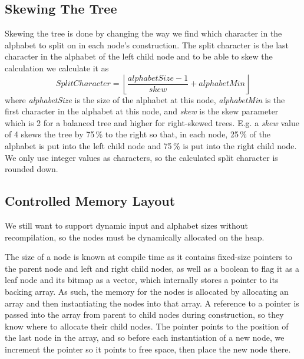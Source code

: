 \subsection{Skewing The Tree}
\label{sec:SkewingTheTree}
Skewing the tree is done by changing the way we find which character in the alphabet to split on in each node's construction.
The split character is the last character in the alphabet of the left child node and to be able to skew the calculation we calculate it as
\[\mathit{SplitCharacter} = \left\lfloor \frac{\mathit{alphabetSize}-1}{\mathit{skew}} + \mathit{alphabetMin} \right\rfloor \]
where \textit{alphabetSize} is the size of the alphabet at this node, \textit{alphabetMin} is the first character in the alphabet at this node, and \textit{skew} is the skew parameter which is 2 for a balanced tree and higher for right-skewed trees. E.g. a \textit{skew} value of 4 skews the tree by 75\,\% to the right so that, in each node, 25\,\% of the alphabet is put into the left child node and 75\,\% is put into the right child node.
We only use integer values as characters, so the calculated split character is rounded down.


\subsection{Controlled Memory Layout}
We still want to support dynamic input and alphabet sizes without recompilation, so the nodes must be dynamically allocated on the heap.

The size of a node is known at compile time as it contains fixed-size pointers to the parent node and left and right child nodes, as well as a boolean to flag it as a leaf node and its bitmap as a vector, which internally stores a pointer to its backing array.
As such, the memory for the nodes is allocated by allocating an array and then instantiating the nodes into that array.
A reference to a pointer is passed into the array from parent to child nodes during construction, so they know where to allocate their child nodes.
The pointer points to the position of the last node in the array, and so before each instantiation of a new node, we increment the pointer so it points to free space, then place the new node there.

